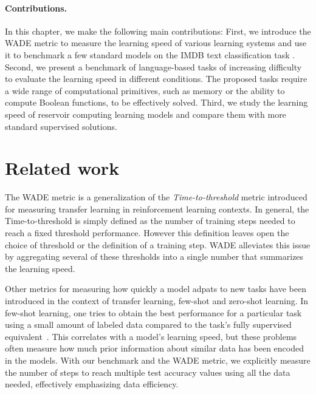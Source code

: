 \paragraph{Contributions.} In this chapter, we make the following main
contributions: First, we introduce the \acf{WADE} metric to measure the learning
speed of various learning systems and use it to benchmark a few standard models
on the IMDB text classification task \parencite{maasLearningWordVectors2011}.
Second, we present a benchmark of language-based tasks of increasing difficulty
to evaluate the learning speed in different conditions. The proposed tasks
require a wide range of computational primitives, such as memory or the ability
to compute Boolean functions, to be effectively solved. Third, we study the
learning speed of reservoir computing learning models and compare them with more
standard supervised solutions.

\section{Related work}
The \ac{WADE} metric is a generalization of the \emph{Time-to-threshold} metric
\parencite{taylorCrossdomainTransferReinforcement2007,
  taylorTransferLearningInterTask2007} introduced for measuring transfer
learning in reinforcement learning contexts. In general, the Time-to-threshold
is simply defined as the number of training steps needed to reach a fixed
threshold performance. However this definition leaves open the choice of
threshold or the definition of a training step. \ac{WADE} alleviates this issue
by aggregating several of these thresholds into a single number that summarizes
the learning speed.

Other metrics for measuring how quickly a model adpats to new tasks have been
introduced in the context of transfer learning, few-shot and zero-shot learning.
In few-shot learning, one tries to obtain the best performance for a particular
task using a small amount of labeled data compared to the task's fully
supervised equivalent~\parencite{wangGeneralizingFewExamples2020}. This correlates
with a model's learning speed, but these problems often measure how much prior
information about similar data has been encoded in the models. With our
benchmark and the \ac{WADE} metric, we explicitly measure the number of steps to reach
multiple test accuracy values using all the data needed, effectively emphasizing
data efficiency.

